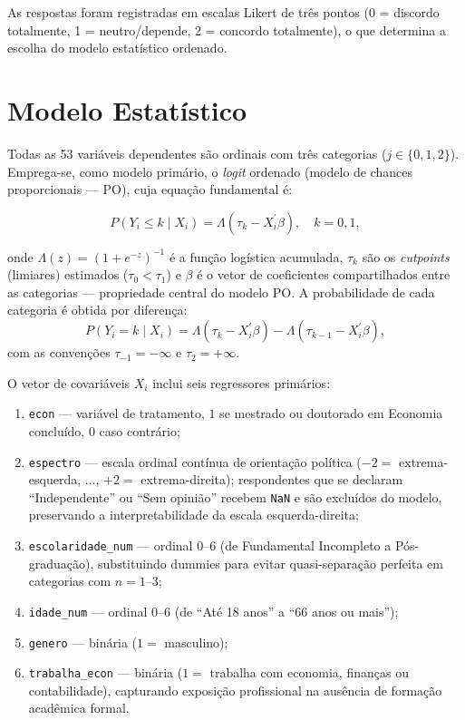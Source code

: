 As respostas foram registradas em escalas Likert de três pontos (0 = discordo totalmente, 1 = neutro/depende, 2 = concordo totalmente), o que determina a escolha do modelo estatístico ordenado.

\section{Modelo Estatístico}\label{sec:modelo-estatistico}

Todas as 53 variáveis dependentes são ordinais com três categorias ($j \in \{0, 1, 2\}$). Emprega-se, como modelo primário, o \textit{logit} ordenado (modelo de chances proporcionais — PO), cuja equação fundamental é:

\begin{equation}\label{eq:logit_ord_v2}
P(Y_i \leq k \mid X_i) = \Lambda\!\left(\tau_k - X_i^\prime \beta\right),
\quad k = 0, 1,
\end{equation}

onde $\Lambda(z) = (1 + e^{-z})^{-1}$ é a função logística acumulada, $\tau_k$ são os \textit{cutpoints} (limiares) estimados ($\tau_0 < \tau_1$) e $\beta$ é o vetor de coeficientes compartilhados entre as categorias — propriedade central do modelo PO. A probabilidade de cada categoria é obtida por diferença:
\[
P(Y_i = k \mid X_i) = \Lambda(\tau_k - X_i^\prime \beta) - \Lambda(\tau_{k-1} - X_i^\prime \beta),
\]
com as convenções $\tau_{-1} = -\infty$ e $\tau_2 = +\infty$.

O vetor de covariáveis $X_i$ inclui seis regressores primários:

\begin{enumerate}[label=\roman*)]
    \item \texttt{econ} — variável de tratamento, $1$ se mestrado ou doutorado em Economia concluído, $0$ caso contrário;
    \item \texttt{espectro} — escala ordinal contínua de orientação política ($-2 =$ extrema-esquerda, $\ldots$, $+2 =$ extrema-direita); respondentes que se declaram ``Independente'' ou ``Sem opinião'' recebem \texttt{NaN} e são excluídos do modelo, preservando a interpretabilidade da escala esquerda-direita;
    \item \texttt{escolaridade\_num} — ordinal $0$--$6$ (de Fundamental Incompleto a Pós-graduação), substituindo dummies para evitar quasi-separação perfeita em categorias com $n = 1$--$3$;
    \item \texttt{idade\_num} — ordinal $0$--$6$ (de ``Até 18 anos'' a ``66 anos ou mais'');
    \item \texttt{genero} — binária ($1 =$ masculino);
    \item \texttt{trabalha\_econ} — binária ($1 =$ trabalha com economia, finanças ou contabilidade), capturando exposição profissional na ausência de formação acadêmica formal.
\end{enumerate}


